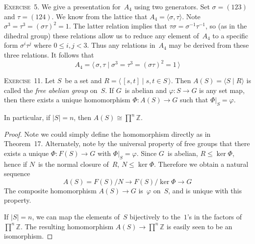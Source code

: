 \documentclass[letterpaper]{article}
\newcommand{\exercise}[1]{\goodbreak\noindent\textsc{Exercise~{#1}.}}
\newcommand{\Z}{\mathbb{Z}}
\newcommand{\iso}{\cong}
\newcommand{\subgroup}{\le}
\newcommand{\ord}[1]{|{#1}|}
\newcommand{\gen}[1]{\langle{#1}\rangle}
\begin{document}
\exercise{5}
We give a presentation for~$A_4$ using two generators. Set $\sigma=(123)$ and $\tau=(124)$. We know from the lattice that $A_4=\gen{\sigma,\tau}$. Note $\sigma^3=\tau^3=(\sigma\tau)^2=1$. The latter relation implies that $\tau\sigma=\sigma^{-1}\tau^{-1}$, so (as in the dihedral group) these relations allow us to reduce any element of~$A_4$ to a specific form $\sigma^i\tau^j$ where $0\le i,j<3$. Thus any relations in~$A_4$ may be derived from these three relations. It follows that
$$A_4=\gen{\,\sigma,\tau\mid \sigma^3=\tau^3=(\sigma\tau)^2=1\,}$$

\bigskip
\exercise{11}
Let $S$~be a set and $R=\gen{\,[s,t]\mid s,t\in S\,}$. Then $A(S)=\gen{S\mid R}$ is called the \emph{free abelian group} on~$S$. If $G$~is abelian and $\varphi:S\to G$ is any set map, then there exists a unique homomorphism $\Phi:A(S)\to G$ such that $\Phi|_S=\varphi$.

In particular, if $\ord{S}=n$, then $A(S)\iso\prod^n\Z$.
\begin{proof}
Note we could simply define the homomorphism directly as in Theorem~17. Alternately, note by the universal property of free groups that there exists a unique $\Phi:F(S)\to G$ with $\Phi|_S=\varphi$. Since $G$~is abelian, $R\subgroup\ker\Phi$, hence if $N$~is the normal closure of~$R$, $N\subgroup\ker\Phi$. Therefore we obtain a natural sequence
$$A(S)=F(S)/N\longrightarrow F(S)/\ker\Phi\longrightarrow G$$
The composite homomorphism $A(S)\to G$ is~$\varphi$ on~$S$, and is unique with this property.

If $\ord{S}=n$, we can map the elements of~$S$ bijectively to the~$1$'s in the factors of~$\prod^n\Z$. The resulting homomorphism $A(S)\to\prod^n\Z$ is easily seen to be an isomorphism.
\end{proof}
\end{document}
